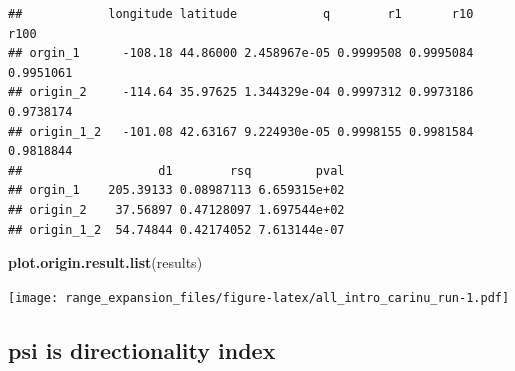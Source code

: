 \documentclass[]{article}
\newenvironment{Shaded}{\begin{snugshade}}{\end{snugshade}}
\newcommand{\KeywordTok}[1]{\textcolor[rgb]{0.13,0.29,0.53}{\textbf{#1}}}
\newcommand{\NormalTok}[1]{#1}
\begin{document}
\begin{verbatim}
##            longitude latitude            q        r1       r10      r100
## orgin_1      -108.18 44.86000 2.458967e-05 0.9999508 0.9995084 0.9951061
## origin_2     -114.64 35.97625 1.344329e-04 0.9997312 0.9973186 0.9738174
## origin_1_2   -101.08 42.63167 9.224930e-05 0.9998155 0.9981584 0.9818844
##                   d1        rsq         pval
## orgin_1    205.39133 0.08987113 6.659315e+02
## origin_2    37.56897 0.47128097 1.697544e+02
## origin_1_2  54.74844 0.42174052 7.613144e-07
\end{verbatim}

\begin{Shaded}
\begin{Highlighting}[]
\KeywordTok{plot.origin.result.list}\NormalTok{(results)}
\end{Highlighting}
\end{Shaded}

\texttt{[image: range\_expansion\_files/figure-latex/all\_intro\_carinu\_run-1.pdf]}

\subsection{psi is directionality
index}\label{psi-is-directionality-index}
\end{document}
